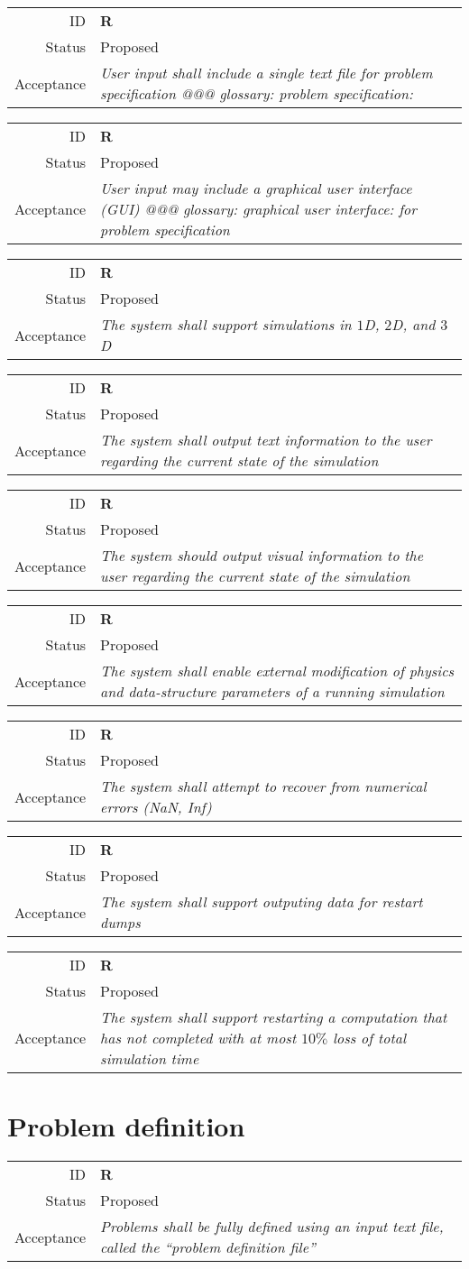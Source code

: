 \documentclass{book}
\newcommand{\req}[3]{
\begin{tabular}{rl}
ID & \textbf{R#1} \\
Status & \textsf{#2} \\
Acceptance & \textit{#3}
\end{tabular}
}
\begin{document}
\req
  {}
  {Proposed}
%
  {User input shall include a single text file for problem
  specification @@@ glossary: problem specification: }

\req
  {}
  {Proposed}
%
  {User input may include a graphical user interface (GUI) @@@
  glossary: graphical user interface: for problem specification}

\req
  {}
  {Proposed}
%
  {The system shall support simulations in $1$D, $2$D, and $3$D}

\req
  {}
  {Proposed}
%
  {The system shall output text information to the user regarding the
  current state of the simulation}

\req
  {}
  {Proposed}
%
  {The system should output visual information to the user regarding
  the current state of the simulation}

\req
  {}
  {Proposed}
%
  {The system shall enable external modification of physics and
  data-structure parameters of a running simulation}

\req
  {}
  {Proposed}
  {The system shall attempt to recover from numerical errors (NaN, Inf)}

\req
  {} {Proposed}
%
  {The system shall support outputing data for restart dumps}

\req
  {} {Proposed}
%
  {The system shall support restarting a computation that has not
  completed with at most $10\%$ loss of total simulation time}

\section{Problem definition}


\req
  {}
  {Proposed}
%
  {Problems shall be fully defined using an input text file, called
  the ``problem definition file''}
\end{document}
